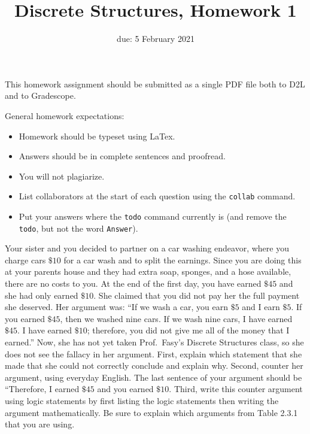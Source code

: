 \documentclass{article}
\title{Discrete Structures, Homework 1}
\author{Patrick O'Connopr (Patrick OConnor (322)#5249)}
\date{due: 5 February 2021}
\begin{document}
\maketitle

This homework assignment should be
submitted as a single PDF file both to D2L and to Gradescope.

General homework expectations:
\begin{itemize}
    \item Homework should be typeset using LaTex.
    \item Answers should be in complete sentences and proofread.
    \item You will not plagiarize.  \item List collaborators at the start of each question using the \texttt{collab} command.
    \item Put your answers where the \texttt{todo} command currently is (and
        remove the \texttt{todo}, but not the word \texttt{Answer}).
\end{itemize}

 
Your sister and you decided to partner on a car washing endeavor, where you
charge cars $\$10$ for a car wash and to split the earnings.  Since you are
doing this at your parents house and they had extra soap, sponges, and a hose
available, there are no costs to you.  At the end of the first day, you have
earned $\$45$ and she had only earned $\$10$. She claimed that you did not pay
her the full payment she deserved. Her argument was: ``If we wash a car, you
earn $\$5$ and I earn $\$5$.  If you earned $\$45$, then we washed nine cars.  If
we wash nine cars, I have earned $\$45$.  I have earned $\$10$; therefore, you
did not give me all of the money that I earned.''  Now, she has not yet taken
Prof.~Fasy's Discrete Structures class, so she does not see the fallacy in her
argument. First, explain which statement that she made that she could not
correctly conclude and explain why.  Second, counter her argument, using
everyday English. The last sentence of your argument should be ``Therefore, I
earned $\$45$ and you earned $\$10$. Third, write this counter argument using
logic statements by first listing the logic statements then writing the argument
mathematically.  Be sure to explain which arguments from Table 2.3.1 that you
are using.
\end{document}
